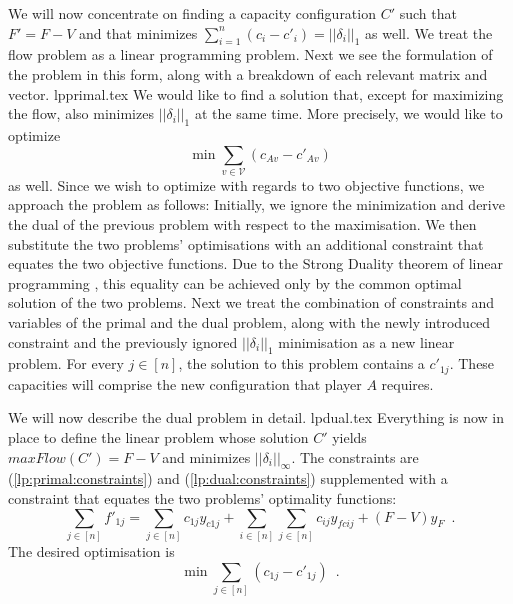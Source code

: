   We will now concentrate on finding a capacity configuration $C'$ such that $F' = F - V$ and that minimizes
  $\sum\limits_{i=1}^{n}\left(c_i-c'_i\right) = ||\delta_i||_1$ as well. We treat the flow problem as a linear programming
  problem. Next we see the formulation of the problem in this form, along with a breakdown of each relevant matrix and
  vector.
  {lpprimal.tex}
  We would like to find a solution that, except for maximizing the flow, also minimizes $||\delta_i||_1$ at the same time.
  More precisely, we would like to optimize
  \begin{equation*}
    \min{\sum\limits_{v \in \mathcal{V}}\left(c_{Av} - c'_{Av}\right)}
  \end{equation*}
  as well.
  Since we wish to optimize with regards to two objective functions, we approach the problem as follows: Initially, we ignore
  the minimization and derive the dual of the previous problem with respect to the maximisation. We then substitute the two
  problems' optimisations with an additional constraint that equates the two objective functions. Due to the Strong Duality
  theorem of linear programming \cite{amo}, this equality can be achieved only by the common optimal solution of the
  two problems. Next we treat the combination of constraints and variables of the primal and the dual problem, along with the
  newly introduced constraint and the previously ignored $||\delta_i||_1$ minimisation as a new linear problem. For every
  $j \in \left[n\right]$, the solution to this problem contains a $c'_{1j}$. These capacities will comprise the new
  configuration that player $A$ requires.

  We will now describe the dual problem in detail.
  {lpdual.tex}
  Everything is now in place to define the linear problem whose solution $C'$ yields $maxFlow\left(C'\right) = F - V$ and
  minimizes $||\delta_i||_\infty$. The constraints are (\ref{lp:primal:constraints}) and (\ref{lp:dual:constraints})
  supplemented with a constraint that equates the two problems' optimality functions:
  \begin{equation*}
    \sum\limits_{j \in \left[n\right]}f'_{1j} = \sum\limits_{j \in \left[n\right]}c_{1j}y_{c1j} +
    \sum\limits_{i \in \left[n\right]}\sum\limits_{j \in \left[n\right]}c_{ij}y_{fcij} + \left(F - V\right)y_F \enspace.
  \end{equation*}
  The desired optimisation is
  \begin{equation*}
    \min{\sum\limits_{j \in \left[n\right]}\left(c_{1j} - c'_{1j}\right)} \enspace.
  \end{equation*}
